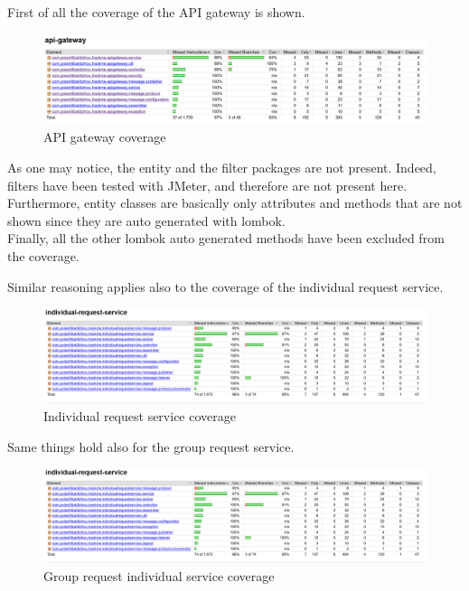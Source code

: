 \par 
First of all the coverage of the API gateway is shown.

\begin{figure}[H]
\includegraphics[width=\linewidth]{images/CoverageApigateway.png}
\caption{ API gateway coverage}
\label{fig:cvgapigateway}
\end{figure}


As one may notice, the entity and the filter packages are not present. Indeed, filters have been tested with JMeter, and therefore are not
present here. 
Furthermore, entity classes are basically only attributes and methods that are not shown since they are auto generated with lombok. \\
Finally, all the other lombok auto generated methods have been excluded from the coverage.

\par 
Similar reasoning applies also to the coverage of the individual request service.
\begin{figure}[H]
\includegraphics[width=\linewidth]{images/CoverageIndividualrequestservice.png}
\caption{ Individual request service coverage}
\label{fig:cvgindividual}
\end{figure}

\par 
Same things hold also for the group request service.
\begin{figure}[H]
\includegraphics[width=\linewidth]{images/CoverageIndividualrequestservice.png}
\caption{ Group request individual service coverage}
\label{fig:cvggroup}
\end{figure}

